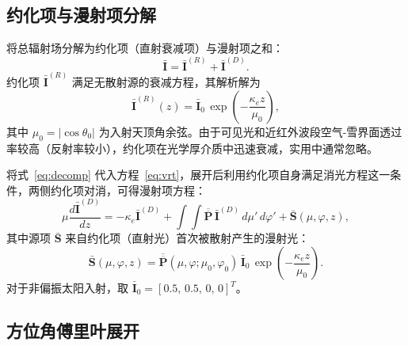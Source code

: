 \documentclass[UTF8,a4paper,12pt]{ctexart}
\begin{document}
\subsection{约化项与漫射项分解}

将总辐射场分解为约化项（直射衰减项）与漫射项之和：
\begin{equation}
  \bar{\mathbf{I}} = \bar{\mathbf{I}}^{(R)} + \bar{\mathbf{I}}^{(D)}.
  \label{eq:decomp}
\end{equation}
约化项 $\bar{\mathbf{I}}^{(R)}$ 满足无散射源的衰减方程，其解析解为
\begin{equation}
  \bar{\mathbf{I}}^{(R)}(z)
  = \bar{\mathbf{I}}_0\,\exp\!\left(-\frac{\kappa_e z}{\mu_0}\right),
  \label{eq:reduced}
\end{equation}
其中 $\mu_0=|\cos\theta_0|$ 为入射天顶角余弦。由于可见光和近红外波段空气-雪界面透过率较高（反射率较小），约化项在光学厚介质中迅速衰减，实用中通常忽略。

将式~\eqref{eq:decomp} 代入方程~\eqref{eq:vrt}，展开后利用约化项自身满足消光方程这一条件，两侧约化项对消，可得漫射项方程：
\begin{equation}
  \mu\frac{d\bar{\mathbf{I}}^{(D)}}{dz}
  = -\kappa_e\bar{\mathbf{I}}^{(D)}
  + \int\!\!\int\overline{\overline{\mathbf{P}}}\,\bar{\mathbf{I}}^{(D)}\,d\mu'\,d\varphi'
  + \bar{\mathbf{S}}(\mu,\varphi,z),
  \label{eq:diffuse}
\end{equation}
其中源项 $\bar{\mathbf{S}}$ 来自约化项（直射光）首次被散射产生的漫射光：
\begin{equation}
  \bar{\mathbf{S}}(\mu,\varphi,z)
  = \overline{\overline{\mathbf{P}}}(\mu,\varphi;\mu_0,\varphi_0)\,\bar{\mathbf{I}}_0
    \,\exp\!\left(-\frac{\kappa_e z}{\mu_0}\right).
  \label{eq:source}
\end{equation}
对于非偏振太阳入射，取 $\bar{\mathbf{I}}_0=[0.5,\,0.5,\,0,\,0]^T$。

\subsection{方位角傅里叶展开}
\end{document}
